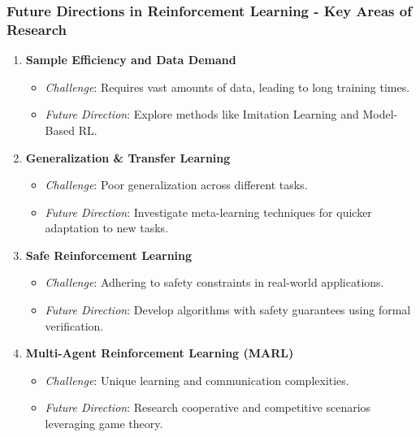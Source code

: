 \documentclass[aspectratio=169]{beamer}
\begin{document}
\begin{frame}[fragile]
    \frametitle{Future Directions in Reinforcement Learning - Key Areas of Research}
    \begin{enumerate}
        \item \textbf{Sample Efficiency and Data Demand}
        \begin{itemize}
            \item \textit{Challenge}: Requires vast amounts of data, leading to long training times.
            \item \textit{Future Direction}: Explore methods like Imitation Learning and Model-Based RL.
        \end{itemize}

        \item \textbf{Generalization \& Transfer Learning}
        \begin{itemize}
            \item \textit{Challenge}: Poor generalization across different tasks.
            \item \textit{Future Direction}: Investigate meta-learning techniques for quicker adaptation to new tasks.
        \end{itemize}

        \item \textbf{Safe Reinforcement Learning}
        \begin{itemize}
            \item \textit{Challenge}: Adhering to safety constraints in real-world applications.
            \item \textit{Future Direction}: Develop algorithms with safety guarantees using formal verification.
        \end{itemize}

        \item \textbf{Multi-Agent Reinforcement Learning (MARL)}
        \begin{itemize}
            \item \textit{Challenge}: Unique learning and communication complexities.
            \item \textit{Future Direction}: Research cooperative and competitive scenarios leveraging game theory.
        \end{itemize}
    \end{enumerate}
\end{frame}
\end{document}
